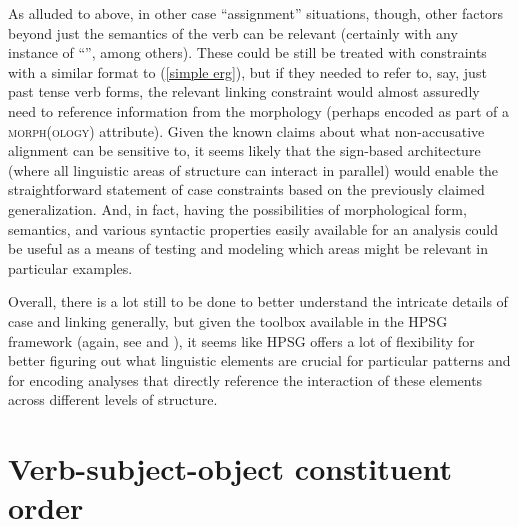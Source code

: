 \documentclass[output=paper
	        ,collection
	        ,collectionchapter
 	        ,biblatex
                ,babelshorthands
                ,newtxmath
                ,draftmode
                ,colorlinks, citecolor=brown
]{langscibook}
\begin{document}
As alluded to above, in other case ``assignment'' situations, though, other factors beyond just the semantics of the verb can be relevant (certainly with any instance of ``'', among others). These could be still be treated with constraints with a similar format to (\ref{simple erg}), but if they needed to refer to, say, just past tense verb forms, the relevant linking constraint would almost assuredly need to reference information from the morphology (perhaps encoded as part of a \textsc{morph(ology)} attribute). Given the known claims about what non-accusative alignment can be sensitive to,  it seems likely that the sign-based architecture (where all linguistic areas of structure can interact in parallel) would enable the straightforward statement of case constraints based on the previously claimed generalization. And, in fact, having the possibilities of morphological form, semantics, and various syntactic properties easily available for an analysis could be useful as a means of testing and modeling which areas might be relevant in particular examples.

Overall, there is a lot still to be done to better understand the intricate details of case and linking generally, but given the toolbox available in the HPSG framework (again, see  and ), it seems like HPSG offers a lot of flexibility for better figuring out what linguistic elements are crucial for particular patterns and for encoding analyses that directly reference the interaction of these elements across different levels of structure.      

\section{Verb-subject-object constituent order}
\end{document}
